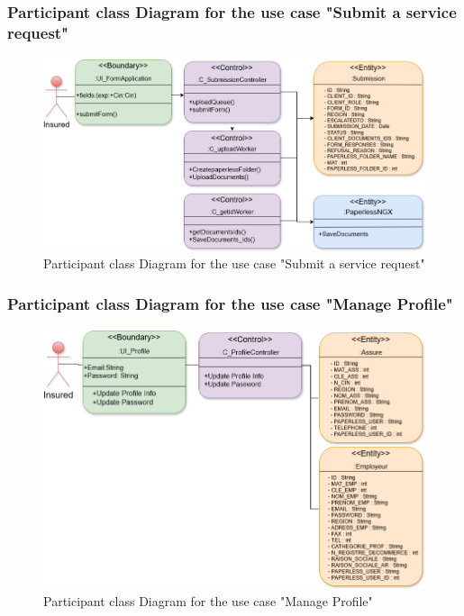 \subsubsection{Participant class Diagram for the use case "Submit a service request"}
 \begin{figure}[h!]
    \centering
    \includegraphics[width=1\textwidth]{figures/dc Submits a service request.png}
    \caption{Participant class Diagram for the use case "Submit a service request"}
\end{figure}

\subsubsection{Participant class Diagram for the use case "Manage Profile"}
 \begin{figure}[h!]
    \centering
    \includegraphics[width=1\textwidth]{figures/dc manage profile.png}
    \caption{Participant class Diagram for the use case "Manage Profile"}
\end{figure}
\clearpage

